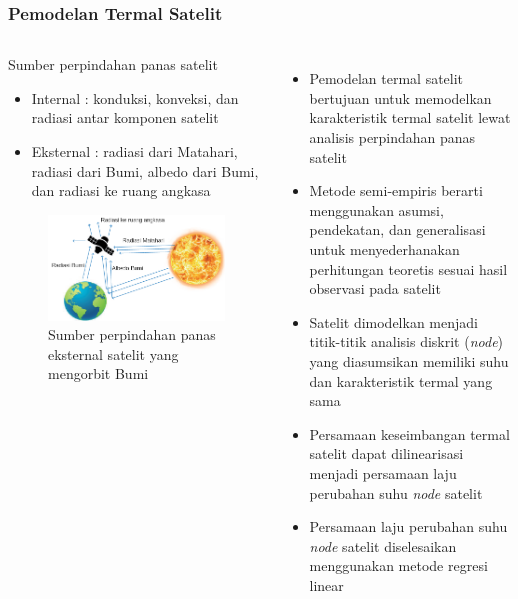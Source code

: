 \documentclass[8pt]{beamer}
\begin{document}
\begin{frame}
  \frametitle{Pemodelan Termal Satelit}
  \begin{columns}[T]
    \begin{block}{\center Sumber perpindahan panas satelit}
      \begin{itemize}
        \item Internal : konduksi, konveksi, dan radiasi antar komponen satelit
        \item Eksternal : radiasi dari Matahari, radiasi dari Bumi, albedo dari Bumi, dan radiasi ke ruang angkasa
      \end{itemize}
      \begin{figure}
        \includegraphics[width=1.0\textwidth]{figure/external_source.png}
        Sumber perpindahan panas eksternal satelit yang mengorbit Bumi \cite{abdelkhalek2019}
      \end{figure}
    \end{block}
    \begin{itemize}
      \item Pemodelan termal satelit bertujuan untuk memodelkan karakteristik termal satelit lewat analisis perpindahan panas satelit
      \item Metode semi-empiris berarti menggunakan asumsi, pendekatan, dan generalisasi untuk menyederhanakan perhitungan teoretis sesuai hasil observasi pada satelit
      \item Satelit dimodelkan menjadi titik-titik analisis diskrit (\textit{node}) yang diasumsikan memiliki suhu dan karakteristik termal yang sama
      \item Persamaan keseimbangan termal satelit dapat dilinearisasi menjadi persamaan laju perubahan suhu \textit{node} satelit
      \item Persamaan laju perubahan suhu \textit{node} satelit diselesaikan menggunakan metode regresi linear
    \end{itemize}
  \end{columns}
\end{frame}
\end{document}
